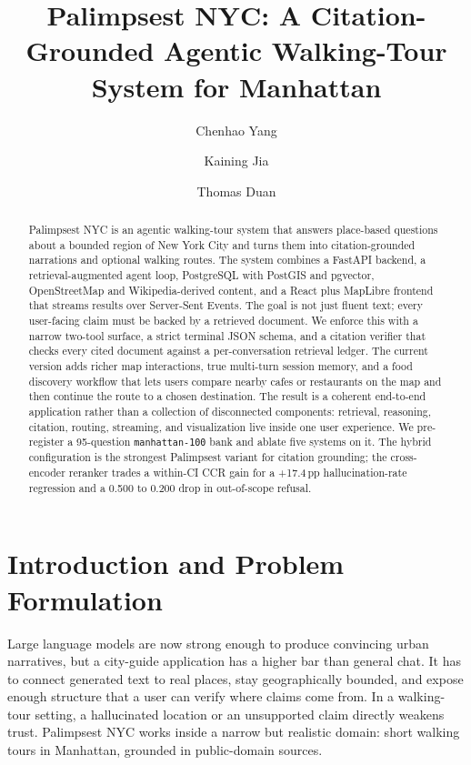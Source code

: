 \documentclass[sigconf,nonacm]{acmart}
\title{Palimpsest NYC: A Citation-Grounded Agentic Walking-Tour System for Manhattan}
\author{Chenhao Yang}
\affiliation{%
  \institution{Columbia University}
  \city{New York}
  \state{NY}
  \country{USA}
}
\author{Kaining Jia}
\affiliation{%
  \institution{Columbia University}
  \city{New York}
  \state{NY}
  \country{USA}
}
\author{Thomas Duan}
\affiliation{%
  \institution{Columbia University}
  \city{New York}
  \state{NY}
  \country{USA}
}
\begin{document}
\begin{abstract}
Palimpsest NYC is an agentic walking-tour system that answers place-based questions about a bounded region of New York City and turns them into citation-grounded narrations and optional walking routes. The system combines a FastAPI backend, a retrieval-augmented agent loop, PostgreSQL with PostGIS and pgvector, OpenStreetMap and Wikipedia-derived content, and a React plus MapLibre frontend that streams results over Server-Sent Events. The goal is not just fluent text; every user-facing claim must be backed by a retrieved document. We enforce this with a narrow two-tool surface, a strict terminal JSON schema, and a citation verifier that checks every cited document against a per-conversation retrieval ledger. The current version adds richer map interactions, true multi-turn session memory, and a food discovery workflow that lets users compare nearby cafes or restaurants on the map and then continue the route to a chosen destination. The result is a coherent end-to-end application rather than a collection of disconnected components: retrieval, reasoning, citation, routing, streaming, and visualization live inside one user experience. We pre-register a 95-question \texttt{manhattan-100} bank and ablate five systems on it. The hybrid configuration is the strongest Palimpsest variant for citation grounding; the cross-encoder reranker trades a within-CI CCR gain for a +17.4\,pp hallucination-rate regression and a 0.500 to 0.200 drop in out-of-scope refusal.
\end{abstract}

\maketitle

\section{Introduction and Problem Formulation}
Large language models are now strong enough to produce convincing urban narratives, but a city-guide application has a higher bar than general chat. It has to connect generated text to real places, stay geographically bounded, and expose enough structure that a user can verify where claims come from. In a walking-tour setting, a hallucinated location or an unsupported claim directly weakens trust. Palimpsest NYC works inside a narrow but realistic domain: short walking tours in Manhattan, grounded in public-domain sources.
\end{document}
